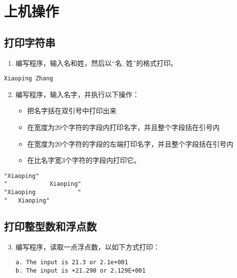 \section{上机操作}

\subsection{打印字符串}
\begin{frame}[fragile]\ft{\subsecname}
\begin{enumerate}\setcounter{enumi}{0} 
\item 编写程序，输入名和姓，然后以“名, 姓”的格式打印。
\end{enumerate}

\begin{lstlisting}
Xiaoping Zhang
\end{lstlisting}
\end{frame}


\begin{frame}[fragile]\ft{\subsecname}
\begin{enumerate}\setcounter{enumi}{1} 
\item 编写程序，输入名字，并执行以下操作：\\[0.05in]
\begin{itemize}
\item 把名字括在双引号中打印出来\\[0.1in]
\item 在宽度为20个字符的字段内打印名字，并且整个字段括在引号内\\[0.1in]
\item 在宽度为20个字符的字段的左端打印名字，并且整个字段括在引号内\\[0.1in]
\item 在比名字宽3个字符的字段内打印它。
\end{itemize}
\end{enumerate}

\begin{lstlisting}[showspaces=true]
"Xiaoping"
"            Xiaoping"
"Xiaoping            "
"   Xiaoping"
\end{lstlisting}
\end{frame}

\subsection{打印整型数和浮点数}
\begin{frame}[fragile]\ft{\subsecname}
\begin{enumerate}\setcounter{enumi}{2} 
\item 编写程序，读取一点浮点数，以如下方式打印：
\begin{lstlisting}[showspaces=true]
a. The input is 21.3 or 2.1e+001
b. The input is +21.290 or 2.129E+001
\end{lstlisting}
\end{enumerate}
\end{frame}


